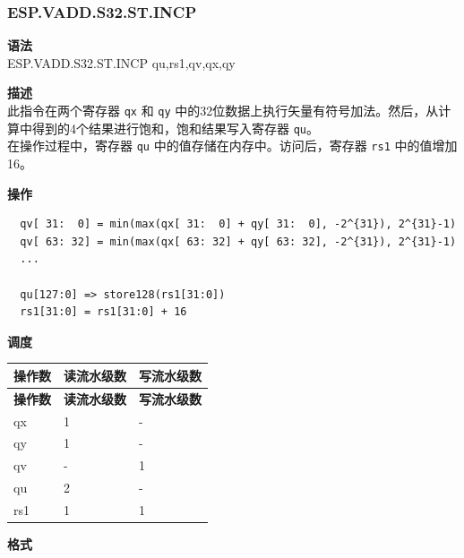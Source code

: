 \newpage
\subsubsection{ESP.VADD.S32.ST.INCP}\label{instruction:ESPVADDS32STINCP}
\textbf{语法}\\
ESP.VADD.S32.ST.INCP qu,rs1,qv,qx,qy

\textbf{描述}\\
此指令在两个寄存器 \lstinline{qx} 和 \lstinline{qy} 中的32位数据上执行矢量有符号加法。然后，从计算中得到的4个结果进行饱和，饱和结果写入寄存器 \lstinline{qu}。\\ 在操作过程中，寄存器 \lstinline{qu} 中的值存储在内存中。访问后，寄存器 \lstinline{rs1} 中的值增加16。

\textbf{操作}\\
\begin{lstlisting}
  qv[ 31:  0] = min(max(qx[ 31:  0] + qy[ 31:  0], -2^{31}), 2^{31}-1)
  qv[ 63: 32] = min(max(qx[ 63: 32] + qy[ 63: 32], -2^{31}), 2^{31}-1)
  ...

  qu[127:0] => store128(rs1[31:0])
  rs1[31:0] = rs1[31:0] + 16
\end{lstlisting}


\textbf{调度}\\
\begin{longtable}[c]{|l|l|l|}
    \hline
    \rowcolor{lightgray}
    \textbf{操作数} & \textbf{读流水级数} & \textbf{写流水级数} \\\hline
    \endfirsthead
    \hline
    \rowcolor{lightgray}
     \textbf{操作数} & \textbf{读流水级数} & \textbf{写流水级数} \\\hline
    \endhead
    \hline
    \endfoot

    qx & 1 & - \\\hline
  qy & 1 & - \\\hline
     qv & - & 1 \\\hline
     qu & 2 & - \\\hline
     rs1 & 1 & 1

\end{longtable}

\textbf{格式}\\


